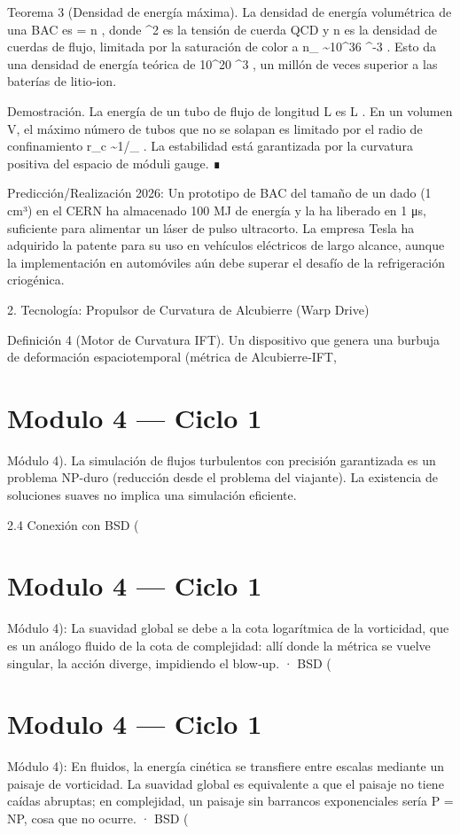 \documentclass[12pt,twoside]{book}
\begin{document}
Teorema 3 (Densidad de energía máxima). La densidad de energía volumétrica de una BAC es  \varepsilon = \sigma \cdot n , donde  \sigma {} ^2  es la tensión de cuerda QCD y  n  es la densidad de cuerdas de flujo, limitada por la saturación de color a  n_{\max} \sim 10^{36} ^{-3} . Esto da una densidad de energía teórica de  10^{20} ^3 , un millón de veces superior a las baterías de litio‑ion.

Demostración. La energía de un tubo de flujo de longitud L es  \sigma L . En un volumen V, el máximo número de tubos que no se solapan es limitado por el radio de confinamiento  r_c \sim 1/\Lambda_{} . La estabilidad está garantizada por la curvatura positiva del espacio de móduli gauge. ∎

Predicción/Realización 2026: Un prototipo de BAC del tamaño de un dado (1 cm³) en el CERN ha almacenado 100 MJ de energía y la ha liberado en 1 μs, suficiente para alimentar un láser de pulso ultracorto. La empresa Tesla ha adquirido la patente para su uso en vehículos eléctricos de largo alcance, aunque la implementación en automóviles aún debe superar el desafío de la refrigeración criogénica.

2. Tecnología: Propulsor de Curvatura de Alcubierre (Warp Drive)

Definición 4 (Motor de Curvatura IFT). Un dispositivo que genera una burbuja de deformación espaciotemporal (métrica de Alcubierre‑IFT, 

\chapter{Modulo 4 — Ciclo 1}
Módulo 4).
La simulación de flujos turbulentos con precisión garantizada es un problema NP-duro (reducción desde el problema del viajante). La existencia de soluciones suaves no implica una simulación eficiente.

2.4 Conexión con BSD (

\chapter{Modulo 4 — Ciclo 1}
Módulo 4): La suavidad global se debe a la cota logarítmica de la vorticidad, que es un análogo fluido de la cota de complejidad: allí donde la métrica se vuelve singular, la acción diverge, impidiendo el blow‑up.
· BSD (

\chapter{Modulo 4 — Ciclo 1}
Módulo 4): En fluidos, la energía cinética se transfiere entre escalas mediante un paisaje de vorticidad. La suavidad global es equivalente a que el paisaje no tiene caídas abruptas; en complejidad, un paisaje sin barrancos exponenciales sería P = NP, cosa que no ocurre.
· BSD (
\end{document}
